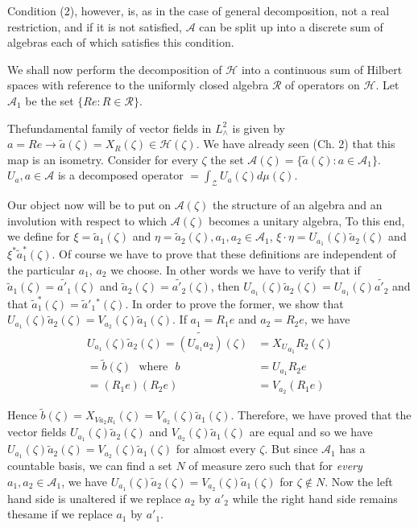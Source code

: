 Condition (2), however, is, as in the case of general decomposition,
not a real restriction, and if it is not satisfied, $\mathcal{A}$ can
be split up into a discrete sum of algebras each of which satisfies
this condition. 

We shall now perform the decomposition of $\mathscr{H}$ into a
continuous sum of Hilbert spaces with reference to the uniformly
closed algebra $\mathscr{R}$ of operators on $\mathscr{H}$. Let
$\mathcal{A}_1$ be the set $\{Re:R \in \mathscr{R}\}$. 

The\pageoriginale fundamental family of vector fields in $L^2_{\wedge}$
is given by 
$a=Re\rightarrow \tilde{a}(\zeta)=X_R(\zeta) \in
\mathscr{H}(\zeta)$. We have already seen (Ch. 2) that this map is an
isometry. Consider for every $\zeta$ the set  
$\mathcal{A}(\zeta)=\{\tilde{a}(\zeta): a \in \mathcal{A}_1\}$. $U_a,a
\in \mathcal{A}$ is a decomposed operator
$=\int_{\mathcal{Z}}U_a(\zeta)d \mu(\zeta)$. 

Our object now will be to put on $\mathcal{A}(\zeta)$ the structure of
an algebra and an involution with respect to which
$\mathcal{A}(\zeta)$ becomes a unitary algebra, To this end, we define
for $\xi =\tilde{a}_1(\zeta)$ and $\eta=\tilde{a}_2(\zeta),a_1,a_2 \in
\mathcal{A}_1$, $\xi\cdot \eta=U_{a_1}(\zeta)\tilde{a}_2(\zeta)$ and 
$\xi^*\tilde{a}_1^*(\zeta)$. Of course we have to prove that these
definitions are independent of the particular $a_1$, $a_2$ we choose. In
other words we have to verify that if  
$\tilde{a}_1(\zeta)=\widetilde{a'_1}(\zeta)$ and
$\tilde{a}_2(\zeta)=\widetilde{a'_2}(\zeta)$, then 
$ U_{a_1}(\zeta)\tilde{a}_{2} (\zeta)  = U_{a_{1}}(\zeta)
\widetilde{a'_2}$ and that $\tilde{a}_{1}^{*}
(\zeta)=\tilde{a}'_{1}{^*}(\zeta)$. In order to prove the former, we
show that
$U_{a_1}(\zeta)\tilde{a}_2(\zeta)=V_{a_2}(\zeta)\tilde{a}_1(\zeta)$. If
$a_1= R_1 e$ and $a_2=R_2e$, we have
\begin{align*}
U_{a_1}(\zeta)\tilde{a}_2(\zeta)  = \widetilde{(U_{a_1}a_2)}(\zeta) &
= X{_U}_{a_1}R_2(\zeta)\\  
=\tilde{b}(\zeta)\text{~ where~ }b & =U_{a_1}R_2e\\
=(R_1e)(R_2e) & =V_{a_2}(R_1e)
\end{align*}

Hence $\tilde{b}
(\zeta)=X_{Va_2R_1}(\zeta)=V_{a_2}(\zeta)\tilde{a}_1(\zeta)$. Therefore,
we have proved that the vector fields
$U_{a_1}(\zeta)\tilde{a}_2(\zeta)$ and
$V_{a_2}(\zeta)\tilde{a}_1(\zeta)$ are equal and so we have
$U_{a_1}(\zeta)\tilde{a}_2(\zeta)=V_{a_2}(\zeta)\tilde{a}_1(\zeta)$
for almost every $\zeta$. But since $\mathcal{A}_1$ has a countable
basis, we can find a set $N$ of measure zero such that for
\textit{every} $a_1,a_2 \in \mathcal{A}_1$, we have
$U_{a_1}(\zeta)\tilde{a}_2(\zeta)=V_{a_2}(\zeta)\tilde{a}_1(\zeta)$
for $\zeta \not\in N$. Now the left hand side is unaltered if we
replace $a_2$ by $a'_2$ while the right hand side remains
the\pageoriginale same if we replace $a_1$ by $a'_1$. 

